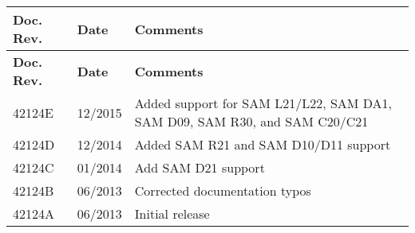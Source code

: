 \tabulinesep=1mm
\begin{longtabu}spread 0pt [c]{*{3}{|X[-1]}|}
\hline
\cellcolor{\tableheadbgcolor}\textbf{ Doc. Rev. }&\cellcolor{\tableheadbgcolor}\textbf{ Date }&\cellcolor{\tableheadbgcolor}\textbf{ Comments  }\\
\endfirsthead
\hline
\endfoot
\hline
\cellcolor{\tableheadbgcolor}\textbf{ Doc. Rev. }&\cellcolor{\tableheadbgcolor}\textbf{ Date }&\cellcolor{\tableheadbgcolor}\textbf{ Comments  }\\
\endhead
42124E &12/2015 &Added support for SAM L21/\+L22, SAM DA1, SAM D09, SAM R30, and SAM C20/\+C21  \\
42124D &12/2014 &Added SAM R21 and SAM D10/\+D11 support  \\
42124C &01/2014 &Add SAM D21 support  \\
42124B &06/2013 &Corrected documentation typos  \\
42124A &06/2013 &Initial release  \\
\end{longtabu}
